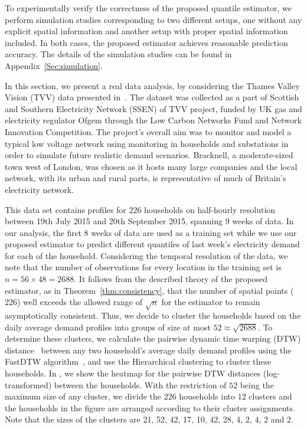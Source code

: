 \documentclass[aos]{imsart}
\theoremstyle{plain}
\theoremstyle{remark}
\begin{document}
To experimentally verify the correctness of the proposed quantile estimator, we perform simulation studies corresponding to two different setups, one without any explicit spatial information and another setup with proper spatial information included. In both cases, the proposed estimator achieves reasonable prediction accuracy. The details of the simulation studies can be found in Appendix~\ref{Sec:simulation}.

In this section, we present a real data analysis, by considering the Thames Valley Vision (TVV) data presented in~\cite{jacob2020forecasting}. The dataset was collected as a part of Scottish and Southern Electricity Network (SSEN) of TVV project, funded by UK gas and electricity regulator Ofgem through the Low Carbon Networks Fund and Network Innovation Competition. The project's overall aim was to monitor and model a typical low voltage network using monitoring in households and substations in order to simulate future realistic demand scenarios. Bracknell, a moderate-sized town west of London, was chosen as it hosts many large companies and the local network, with its urban and rural parts, is representative of much of Britain's electricity network.

This data set contains profiles for $226$ households on half-hourly resolution between 19th July 2015 and 20th September 2015, spanning $9$ weeks of data. In our analysis, the first $8$ weeks of data are used as a training set while we use our proposed estimator to predict different quantiles of last week's electricity demand for each of the household. Considering the temporal resolution of the data, we note that the number of observations for every location in the training set is $n=56 \times 48 = 2688$. It follows from the described theory of the proposed estimator, as in Theorem~\ref{thm:consistency}, that the number of spatial points ($226$) well exceeds the allowed range of $\sqrt{n}$ for the estimator to remain asymptotically consistent. Thus, we decide to cluster the households based on the daily average demand profiles into groups of size at most $52 \approx \sqrt{2688}$. To determine these clusters, we calculate the pairwise dynamic time warping (DTW) distance~\citep{jacob2020forecasting} between any two household's average daily demand profiles using the FastDTW algorithm~\citep{gold2018dynamic}, and use the Hierarchical clustering to cluster these households. In ,  we show the heatmap for the pairwise DTW distances (log-transformed) between the households. With the restriction of $52$ being the maximum size of any cluster, we divide the $226$ households into $12$ clusters and the households in the figure are arranged according to their cluster assignments. Note that the sizes of the clusters are 21, 52, 42, 17, 10, 42, 28, 4, 2, 4, 2 and 2. 
\end{document}
